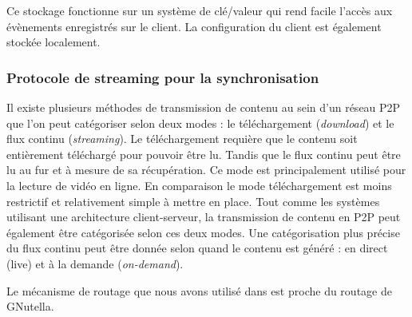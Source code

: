 Ce stockage fonctionne sur un système de clé/valeur qui rend facile l'accès aux 
évènements enregistrés sur le client. La configuration du client est également 
stockée localement. 

\subsubsection{Protocole de streaming pour la synchronisation}
\label{streamingprotocol}

Il existe plusieurs méthodes de transmission de contenu au sein d'un réseau P2P 
que l'on peut catégoriser selon deux modes : le téléchargement (\textit{download}) 
et le flux continu (\textit{streaming}). Le téléchargement requière que le contenu 
soit entièrement téléchargé pour pouvoir être lu. Tandis que le flux continu peut 
être lu au fur et à mesure de sa récupération. Ce mode est principalement utilisé 
pour la lecture de vidéo en ligne. En comparaison le mode téléchargement est 
moins restrictif et relativement simple à mettre en place. Tout comme les 
systèmes utilisant une architecture client-serveur, la transmission de contenu en 
P2P peut également être catégorisée selon ces deux modes. Une catégorisation 
plus précise du flux continu peut être donnée selon quand le contenu est généré : 
en direct (live) et à la demande (\textit{on-demand}).


Le mécanisme de routage que nous avons utilisé dans \cite{Desprat2015a} est 
proche du routage de GNutella. 



